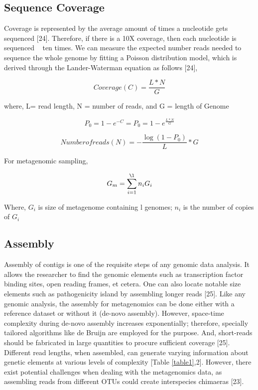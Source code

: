 \subsection{Sequence Coverage}
Coverage is represented by the average amount of times a nucleotide gets sequenced [24]. Therefore, if there is a 10X coverage, then each nucleotide is sequenced ~ ten times. We can measure the expected number reads needed to sequence the whole genome by fitting a Poisson distribution model, which is derived through the Lander-Waterman equation as follows [24],

\begin{equation} 
  Coverage (C) = \frac{L * N}{G}
  \label{eq:eq1}
\end{equation}

where, L= read length, N = number of reads, and G = length of Genome

\begin{equation} 
  P_{0} = 1 - e^{-C} = P_{0} = 1 - e^{\frac{L * N}{G}}
  \label{eq:eq2}
\end{equation}

\begin{equation} 
  Number  of reads (N) = -\frac{\log(1-P_{0})}{L}* G
  \label{eq:eq3}
\end{equation}

For metagenomic sampling,

\begin{equation} 
  G_{m} = \sum_{i=1}^{\l} n_{i}G_{i}
  \label{eq:eq4}
\end{equation}

Where, $G_{i}$ is size of metagenome containing l genomes; $n_{i}$ is the number of copies of $G_{i}$

\subsection{Assembly}
Assembly of contigs is one of the requisite steps of any genomic data analysis. It allows the researcher to find the genomic elements such as transcription factor binding sites, open reading frames, et cetera. One can also locate notable size elements such as pathogenicity island by assembling longer reads [25]. Like any genomic analysis, the assembly for metagenomics can be done either with a reference dataset or without it (de-novo assembly). However, space-time complexity during de-novo assembly increases exponentially; therefore, specially tailored algorithms like de Bruijn are employed for the purpose. And, short-reads should be fabricated in large quantities to procure sufficient coverage [25]. Different read lengths, when assembled, can generate varying information about genetic elements at various levels of complexity [Table \ref{table1},2]. However, there exist potential challenges when dealing with the metagenomics data, as assembling reads from different OTUs could create interspecies chimaeras [23].

